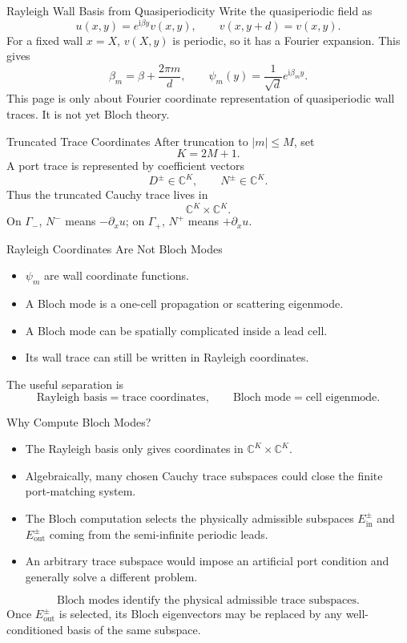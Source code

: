 \documentclass[aspectratio=169]{beamer}
\newcommand{\ii}{\mathrm{i}}
\begin{document}
\begin{frame}{Rayleigh Wall Basis from Quasiperiodicity}
  Write the quasiperiodic field as
  \[
    u(x,y)=e^{\ii\beta y}v(x,y),
    \qquad
    v(x,y+d)=v(x,y).
  \]
  For a fixed wall \(x=X\), \(v(X,y)\) is periodic, so it has a Fourier expansion.
  This gives
  \[
    \beta_m=\beta+\frac{2\pi m}{d},
    \qquad
    \psi_m(y)=\frac{1}{\sqrt d}e^{\ii\beta_m y}.
  \]
  This page is only about Fourier coordinate representation of quasiperiodic wall traces.
  It is not yet Bloch theory.
\end{frame}

\begin{frame}{Truncated Trace Coordinates}
  After truncation to \(|m|\le M\), set
  \[
    K=2M+1.
  \]
  A port trace is represented by coefficient vectors
  \[
    D^\pm\in\mathbb C^K,
    \qquad
    N^\pm\in\mathbb C^K.
  \]
  Thus the truncated Cauchy trace lives in
  \[
    \mathbb C^K\times\mathbb C^K.
  \]
  On \(\Gamma_-\), \(N^-\) means \(-\partial_x u\); on \(\Gamma_+\), \(N^+\) means \(+\partial_x u\).
\end{frame}

\begin{frame}{Rayleigh Coordinates Are Not Bloch Modes}
  \begin{itemize}
    \item \(\psi_m\) are wall coordinate functions.
    \item A Bloch mode is a one-cell propagation or scattering eigenmode.
    \item A Bloch mode can be spatially complicated inside a lead cell.
    \item Its wall trace can still be written in Rayleigh coordinates.
  \end{itemize}
  The useful separation is
  \[
    \text{Rayleigh basis}=\text{trace coordinates},
    \qquad
    \text{Bloch mode}=\text{cell eigenmode}.
  \]
\end{frame}

\begin{frame}{Why Compute Bloch Modes?}
  \begin{itemize}
    \item The Rayleigh basis only gives coordinates in
    \(\mathbb C^K\times\mathbb C^K\).
    \item Algebraically, many chosen Cauchy trace subspaces could close the
    finite port-matching system.
    \item The Bloch computation selects the physically admissible subspaces
    \(E_{\mathrm{in}}^\pm\) and \(E_{\mathrm{out}}^\pm\) coming from the
    semi-infinite periodic leads.
    \item An arbitrary trace subspace would impose an artificial port
    condition and generally solve a different problem.
  \end{itemize}
  \[
    \boxed{\text{Bloch modes identify the physical admissible trace subspaces.}}
  \]
  Once \(E_{\mathrm{out}}^\pm\) is selected, its Bloch eigenvectors may be
  replaced by any well-conditioned basis of the same subspace.
\end{frame}
\end{document}
